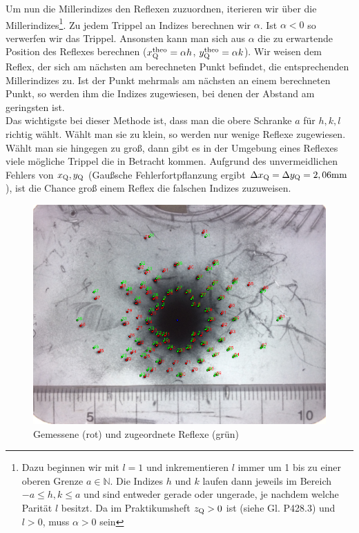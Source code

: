 Um nun die Millerindizes den Reflexen zuzuordnen, iterieren wir über die Millerindizes\footnote{Dazu beginnen wir mit $l=1$ und inkrementieren $l$ immer um 1 bis zu einer oberen Grenze $a \in \mathbb{N}$. Die Indizes $h$ und $k$ laufen dann jeweils im Bereich $-a \leq h,k \leq a$ und sind entweder gerade oder ungerade, je nachdem welche Parität $l$ besitzt. Da im  Praktikumsheft $z\ind{Q} > 0$ ist (siehe Gl. P428.3) und $l > 0$, muss $\alpha > 0$ sein}. Zu jedem Trippel an Indizes berechnen wir $\alpha$. Ist $\alpha < 0$ so verwerfen wir das Trippel. Ansonsten kann man sich aus $\alpha$ die zu erwartende Position des Reflexes berechnen ($x\ind{Q}\upd{theo} = \alpha h$, $y\ind{Q}\upd{theo} = \alpha k$). Wir weisen dem Reflex, der sich am nächsten am berechneten Punkt befindet, die entsprechenden Millerindizes zu. Ist der Punkt mehrmals am nächsten an einem berechneten Punkt, so werden ihm die Indizes zugewiesen, bei denen der Abstand am geringsten ist.\\

Das wichtigste bei dieser Methode ist, dass man die obere Schranke $a$ für $h,k,l$ richtig wählt. Wählt man sie zu klein, so werden nur wenige Reflexe zugewiesen. Wählt man sie hingegen zu groß, dann gibt es in der Umgebung eines Reflexes viele mögliche Trippel die in Betracht kommen. Aufgrund des unvermeidlichen Fehlers von $x\ind{Q}, y\ind{Q}$ (Gaußsche Fehlerfortpflanzung ergibt $\Delta x\ind{Q}= \Delta y\ind{Q} = \si{2,06 \milli\meter}$), ist die Chance groß einem Reflex die falschen Indizes zuzuweisen.

\begin{figure}[h]
\centering
\includegraphics[scale=0.6]{data/laue/draw/laue.png}
\caption{Gemessene (rot) und zugeordnete Reflexe (grün)}
\label{fig:laue_calc}
\end{figure}

